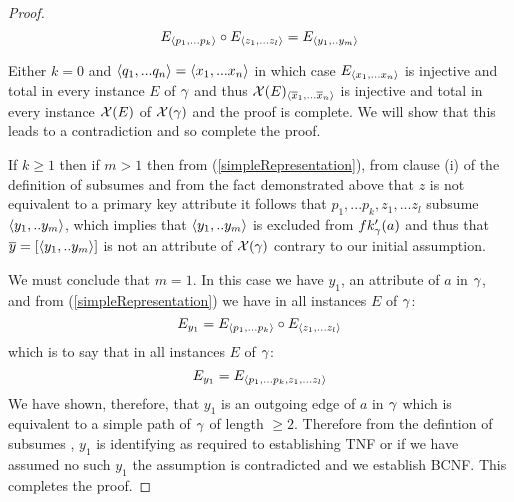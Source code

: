 \begin{proof}
\begin{equation}
\label{simpleRepresentation}
 E_{\langle p_1,...p_k \rangle} \circ E_{\langle z_1,...z_l \rangle} = E_{\langle y_1,..y_m \rangle} 
\end{equation}

Either $k=0$ and $\langle q_1,...q_n\rangle = \langle x_1,...x_n \rangle$ in which case $E_{\langle x_1,...x_n \rangle}$ is
injective and total in every instance $E$ of $\gamma$ and thus $\mathcal{X}(E)_{\langle\overline{x}_1,...\overline{x}_n \rangle}$ is
injective and total in every instance $\mathcal{X}(E)$ of $\mathcal{X}(\gamma)$ and the proof is complete.
We will show that this leads to a contradiction and so complete the proof. 

If $k \ge 1$ then if $m >1$ then
 from  (\ref{simpleRepresentation}),
from clause (i) of the definition of subsumes and from the fact demonstrated above that $z$ is not equivalent to a 
primary key attribute
it follows that $p_1,...p_k,z_1,...z_l$ subsume $\langle y_1,..y_m \rangle$, 
which implies that $\langle y_1,..y_m \rangle$ is excluded from $fk'_{\gamma}(a)$ and thus that 
 $\overline{y}=\left[\langle y_1,..y_m \rangle\right]$ is not an attribute of $\mathcal{X}(\gamma)$ contrary to our 
initial assumption. 

We must conclude that $m=1$.
In this case we have $y_1$, an attribute of $a$ in $\gamma$, and from (\ref{simpleRepresentation})  we have in all instances $E$ of $\gamma$:
\begin{equation}
E_{y_1}=E_{\langle p_1,...p_k \rangle} \circ E_{\langle z_1,...z_l \rangle}
\end{equation}
\noindent which is to say that in all instances $E$ of $\gamma$:
\begin{equation}
E_{y_1}=E_{\langle p_1,...p_k ,z_1,...z_l \rangle}
\end{equation}
\noindent
We have shown, therefore, that $y_1$ is an outgoing edge of $a$ in $\gamma$ 
which is equivalent to a simple path of $\gamma$ of length $\geq 2$.
Therefore from the defintion of subsumes ,  $y_1$ is identifying as required to establishing TNF
or if we have assumed no such $y_1$ the assumption is contradicted and we establish BCNF.
This completes the proof.
\end{proof}

